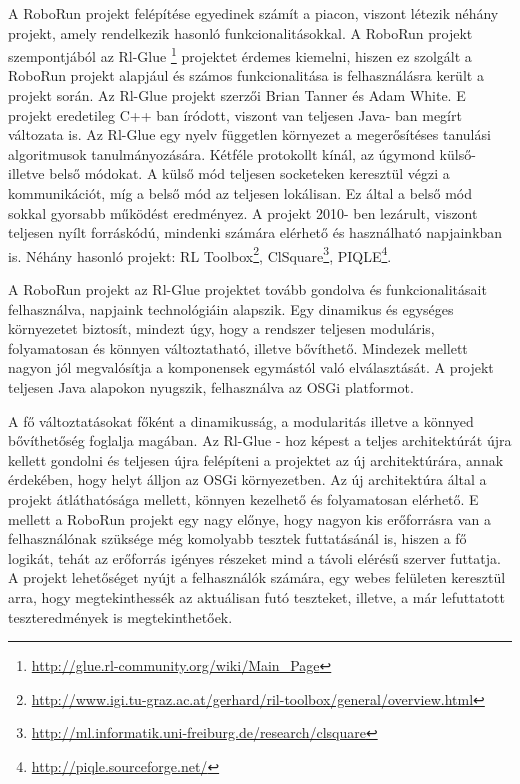 	A RoboRun projekt felépítése egyedinek számít a piacon, viszont létezik néhány projekt, amely rendelkezik hasonló funkcionalitásokkal. A RoboRun projekt szempontjából az Rl-Glue \footnote{\href {http://glue.rl-community.org/wiki/Main\_Page}{http://glue.rl-community.org/wiki/Main\_Page}} projektet érdemes kiemelni, hiszen ez szolgált a RoboRun projekt alapjául és számos funkcionalitása is felhasználásra került a projekt során. Az Rl-Glue\cite{rlglue} projekt szerzői Brian Tanner és Adam White. E projekt eredetileg C++ ban íródott, viszont van teljesen Java- ban megírt változata is. Az Rl-Glue egy nyelv független környezet a megerősítéses tanulási algoritmusok tanulmányozására. Kétféle protokollt kínál, az úgymond külső- illetve belső módokat. A külső mód teljesen socketeken keresztül végzi a kommunikációt, míg a belső mód az teljesen lokálisan. Ez által a belső mód sokkal gyorsabb működést eredményez. A projekt 2010- ben lezárult, viszont teljesen nyílt forráskódú, mindenki számára elérhető és használható napjainkban is. Néhány hasonló projekt: RL Toolbox\footnote{\href {http://www.igi.tu-graz.ac.at/gerhard/ril-toolbox/general/overview.html}{http://www.igi.tu-graz.ac.at/gerhard/ril-toolbox/general/overview.html}}, ClSquare\footnote{\href {http://ml.informatik.uni-freiburg.de/research/clsquare}{http://ml.informatik.uni-freiburg.de/research/clsquare}}, PIQLE\footnote{\href{http://piqle.sourceforge.net/}{http://piqle.sourceforge.net/}}. 


	A RoboRun projekt az Rl-Glue projektet tovább gondolva és funkcionalitásait felhasználva, napjaink technológiáin alapszik. Egy dinamikus és egységes környezetet biztosít, mindezt úgy, hogy a rendszer teljesen moduláris, folyamatosan és könnyen változtatható, illetve bővíthető. Mindezek mellett nagyon jól megvalósítja a komponensek egymástól való elválasztását. A projekt teljesen Java alapokon nyugszik, felhasználva az OSGi platformot. 
	
	A fő változtatásokat főként a dinamikusság, a modularitás illetve a könnyed bővíthetőség foglalja magában. Az Rl-Glue - hoz képest a teljes architektúrát újra kellett gondolni és teljesen újra felépíteni a projektet az új architektúrára, annak érdekében, hogy helyt álljon az OSGi környezetben. Az új architektúra által a projekt átláthatósága mellett, könnyen kezelhető és folyamatosan elérhető. E mellett a RoboRun projekt egy nagy előnye, hogy nagyon kis erőforrásra van a felhasználónak szüksége még komolyabb tesztek futtatásánál is, hiszen a fő logikát, tehát az erőforrás igényes részeket mind a távoli elérésű szerver futtatja. A projekt lehetőséget nyújt a felhasználók számára, egy webes felületen keresztül arra, hogy megtekinthessék az aktuálisan futó teszteket, illetve, a már lefuttatott teszteredmények is megtekinthetőek.	
	

